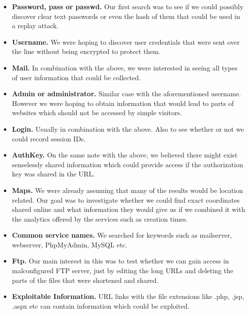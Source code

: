 \documentclass[12pt]{article}
\begin{document}
\begin{itemize}

\item \textbf{Password, pass or passwd.} Our first search was to see if we could possibly discover clear text passwords or even the hash of them that could be used in a replay attack.

\item \textbf{Username.} We were hoping to discover user credentials that were sent over the line without being encrypted to protect them.

\item \textbf{Mail.} In combination with the above, we were interested in seeing all types of user information that could be collected.

\item \textbf{Admin or administrator.} Similar case with the aforementioned username. However we were hoping to obtain information that would lead to parts of websites which should not be accessed by simple visitors.

\item \textbf{Login.} Usually in combination with the above. Also to see whether or not we could record session IDs.

\item \textbf{AuthKey.} On the same note with the above, we believed there might exist senselessly shared information which could provide access if the authorization key was shared in the URL.

\item \textbf{Maps.} We were already assuming that many of the results would be location related. Our goal was to investigate whether we could find exact coordinates shared online and what information they would give us if we combined it with the analytics offered by the services such as creation times.

\item \textbf{Common service names.} We searched for keywords such as mailserver, webserver, PhpMyAdmin, MySQL etc.

\item \textbf{Ftp.} Our main interest in this was to test whether we can gain access in malconfigured FTP server, just by editing the long URLs and deleting the parts of the files that were shortened and shared.

\item \textbf{Exploitable Information.} URL links with the file extensions like .php, .jsp, .aspx etc can contain information which could be exploited.


\end{itemize}
\end{document}
